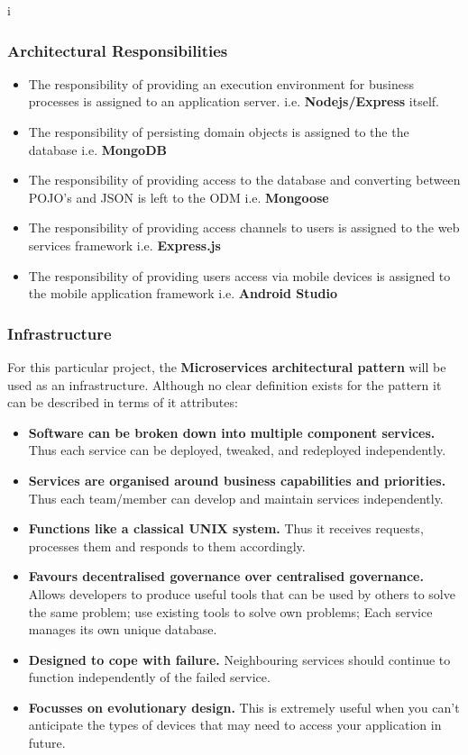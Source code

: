 i\documentclass[a4paper,12pt]{article}
\begin{document}
	\subsubsection{Architectural Responsibilities}
	\begin{itemize}
		\item The responsibility of providing an execution environment for business processes is assigned to an application server. i.e. \textbf{Nodejs/Express} itself.
		\item The responsibility of persisting domain objects is assigned to the the database i.e. \textbf{MongoDB}
		\item The responsibility of providing access to the database and converting between POJO's and JSON is left to the ODM i.e. \textbf{Mongoose}
		\item The responsibility of providing access channels to users is assigned to the web services framework i.e. \textbf{Express.js}
		\item The responsibility of providing users access via mobile devices is assigned to the mobile application framework i.e. \textbf{Android Studio}
	\end{itemize}
	
	\subsubsection{Infrastructure}
	For this particular project, the \textbf{Microservices architectural pattern} will be used as an infrastructure. Although no clear definition exists for the pattern it can be described in terms of it attributes:
	\begin{itemize}
		\item \textbf{Software can be broken down into multiple component services.} Thus each service can be deployed, tweaked, and redeployed independently.
		\item \textbf{Services are organised around business capabilities and priorities.} Thus each team/member can develop and maintain services independently.
		\item \textbf{Functions like a classical UNIX system.} Thus it receives requests, processes them and responds to them accordingly.
		\item \textbf{Favours decentralised governance over centralised governance.} Allows developers to produce useful tools that can be used by others to solve the same problem; use existing tools to solve own problems; Each service manages its own unique database.
		\item \textbf{Designed to cope with failure.} Neighbouring services should continue to function independently of the failed service.
		\item \textbf{Focusses on evolutionary design.} This is extremely useful when you can't anticipate the types of devices that may need to access your application in future.
	\end{itemize}
	
\end{document}
